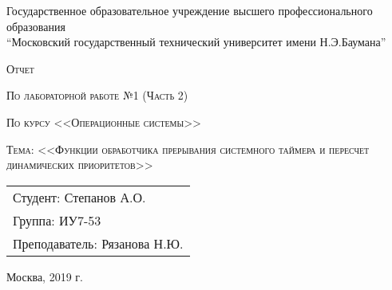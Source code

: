 \begin{titlepage}

    \begin{center}
        \large
        Государственное образовательное учреждение высшего профессионального образования\\
        “Московский государственный технический университет имени Н.Э.Баумана”
        \vspace{5cm}

        \textsc{Отчет}

        \textsc{По лабораторной работе №1 (Часть 2)}

        \textsc{По курсу <<Операционные системы>>}

        \textsc{Тема: <<Функции обработчика прерывания системного таймера и пересчет динамических приоритетов>>}
        \vfill
    \end{center}

    \begin{flushright}
        \begin{tabular}{l}
            \large
            Студент: Степанов А.О. \\
            \large
            Группа: ИУ7-53 \\
            \large
            Преподаватель: Рязанова Н.Ю.
        \end{tabular}
    \end{flushright}

    \begin{center}

        Москва, 2019 г.

    \end{center}

\end{titlepage}
